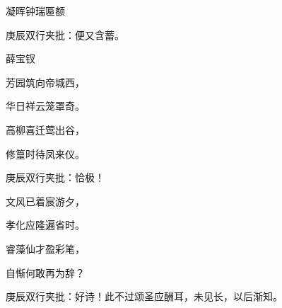 \begin{poem}

    \begin{pl}凝晖钟瑞匾额      \end{pl}        \begin{note}庚辰双行夹批：便又含蓄。\end{note} \begin{pl}薛宝钗\end{pl}

    \begin{pl}芳园筑向帝城西，\end{pl}

    \begin{pl}华日祥云笼罩奇。\end{pl}

    \begin{pl}高柳喜迁莺出谷，\end{pl}

    \begin{pl}修篁时待凤来仪。    \end{pl}      \begin{note}庚辰双行夹批：恰极！\end{note}

    \begin{pl}文风已着宸游夕，\end{pl}

    \begin{pl}孝化应隆遍省时。\end{pl}

    \begin{pl}睿藻仙才盈彩笔，\end{pl}

    \begin{pl}自惭何敢再为辞？    \end{pl}      \begin{note}庚辰双行夹批：好诗！此不过颂圣应酬耳，未见长，以后渐知。\end{note}

\end{poem}

